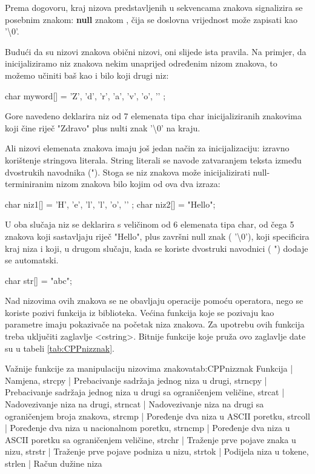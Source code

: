 \documentclass[11pt]{book}
\begin{document}
Prema dogovoru, kraj nizova predstavljenih u sekvencama znakova signalizira se posebnim znakom: \textbf{null} znakom , čija se doslovna vrijednost može zapisati kao '\textbackslash 0'.

Budući da su nizovi znakova obični nizovi, oni slijede ista pravila. Na primjer, da inicijaliziramo niz znakova nekim unaprijed određenim nizom znakova, to možemo učiniti baš kao i bilo koji drugi niz:

\begin{shortlisting}
  char myword[] = { 'Z', 'd', 'r', 'a', 'v', 'o', '\0' };
\end{shortlisting}

Gore navedeno deklarira niz od 7 elemenata tipa char inicijaliziranih
znakovima koji čine riječ "Zdravo" plus nulti znak '\textbackslash 0' na kraju.

Ali nizovi elemenata znakova imaju još jedan način za inicijalizaciju: izravno korištenje stringova literala. String literali se navode zatvaranjem teksta između dvostrukih navodnika ("). Stoga se niz znakova može inicijalizirati null-terminiranim nizom znakova bilo kojim od ova dva izraza:

\begin{shortlisting}
  char niz1[] = { 'H', 'e', 'l', 'l', 'o', '\0' };
  char niz2[] = "Hello";
\end{shortlisting}

U oba slučaja niz se deklarira s veličinom od 6 elemenata tipa char, od čega  5 znakova koji sastavljaju riječ "Hello", plus završni null znak ( '\textbackslash 0'), koji specificira kraj niza i koji, u drugom slučaju, kada se koriste dvostruki navodnici ( ") dodaje se automatski.

\begin{shortlisting}
  char str[] = "abc";
\end{shortlisting}

Nad nizovima ovih znakova se ne obavljaju operacije pomoću operatora, nego se koriste pozivi funkcija iz biblioteka. Većina funkcija koje se pozivaju kao parametre imaju pokazivače na početak niza znakova. Za upotrebu ovih funkcija treba uključiti zaglavlje <cstring>. Bitnije funkcije koje pruža ovo zaglavlje date su u tabeli \ref{tab:CPPnizznak}.

 {Važnije funkcije za manipulaciju nizovima znakova}{tab:CPPnizznak}
{
  Funkcija | Namjena,
  strcpy  | Prebacivanje sadržaja jednog niza u drugi,
  strncpy | Prebacivanje sadržaja jednog niza u drugi sa ograničenjem veličine,
  strcat  | Nadovezivanje niza na drugi,
  strncat | Nadovezivanje niza na drugi sa ograničenjem broja znakova,
  strcmp  | Poređenje dva niza u ASCII poretku,
  strcoll | Poređenje dva niza u nacionalnom poretku,
  strncmp | Poređenje dva niza u ASCII poretku sa ograničenjem veličine,
  strchr  | Traženje prve pojave znaka u nizu,
  strstr  | Traženje prve pojave podniza u nizu,
  strtok  | Podijela niza u tokene,
  strlen  |  Račun dužine niza
}
\end{document}
